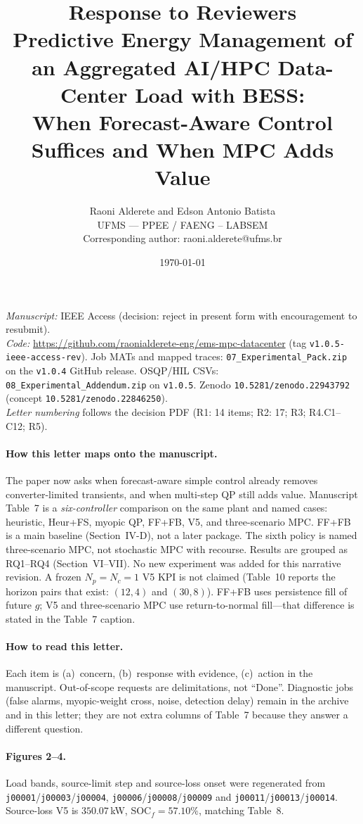 \documentclass[11pt]{article}
\title{Response to Reviewers\\[0.4em]
\large Predictive Energy Management of an Aggregated AI/HPC Data-Center Load with BESS:\\[0.2em]
\normalsize When Forecast-Aware Control Suffices and When MPC Adds Value}
\author{Raoni Alderete and Edson Antonio Batista\\UFMS --- PPEE / FAENG -- LABSEM\\Corresponding author: raoni.alderete@ufms.br}
\date{\today}
\newcommand{\repgithub}{https://github.com/raonialderete-eng/ems-mpc-datacenter}
\begin{document}
\maketitle

\noindent\textit{Manuscript:} IEEE Access (decision: reject in present form with encouragement to resubmit).\\
\textit{Code:} \url{\repgithub} (tag \texttt{v1.0.5-ieee-access-rev}). Job MATs and mapped traces: \texttt{07\_Experimental\_Pack.zip} on the \texttt{v1.0.4} GitHub release. OSQP/HIL CSVs: \texttt{08\_Experimental\_Addendum.zip} on \texttt{v1.0.5}. Zenodo \texttt{10.5281/zenodo.22943792} (concept \texttt{10.5281/zenodo.22846250}).\\
\textit{Letter numbering} follows the decision PDF (R1: 14 items; R2: 17; R3; R4.C1--C12; R5).

\paragraph{How this letter maps onto the manuscript.}
The paper now asks when forecast-aware simple control already removes converter-limited transients, and when multi-step QP still adds value. Manuscript Table~7 is a \emph{six-controller} comparison on the same plant and named cases: heuristic, Heur+FS, myopic QP, FF+FB, V5, and three-scenario MPC. FF+FB is a main baseline (Section~IV-D), not a later package. The sixth policy is named three-scenario MPC, not stochastic MPC with recourse. Results are grouped as RQ1--RQ4 (Section~VI--VII). No new experiment was added for this narrative revision. A frozen $N_p=N_c=1$ V5 KPI is not claimed (Table~10 reports the horizon pairs that exist: $(12,4)$ and $(30,8)$). FF+FB uses persistence fill of future $g$; V5 and three-scenario MPC use return-to-normal fill---that difference is stated in the Table~7 caption.

\paragraph{How to read this letter.}
Each item is (a)~concern, (b)~response with evidence, (c)~action in the manuscript. Out-of-scope requests are delimitations, not ``Done''. Diagnostic jobs (false alarms, myopic-weight cross, noise, detection delay) remain in the archive and in this letter; they are not extra columns of Table~7 because they answer a different question.

\paragraph{Figures 2--4.}
Load bands, source-limit step and source-loss onset were regenerated from \texttt{j00001}/\texttt{j00003}/\texttt{j00004}, \texttt{j00006}/\texttt{j00008}/\texttt{j00009} and \texttt{j00011}/\texttt{j00013}/\texttt{j00014}. Source-loss V5 is $350.07$\,kW, SOC$_f=57.10\%$, matching Table~8.
\end{document}
